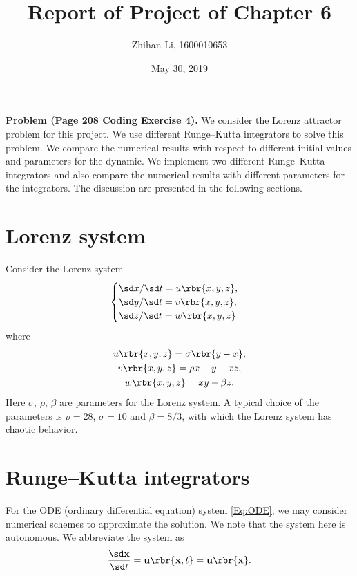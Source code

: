 \documentclass[english, nochinese]{pnote}
\title{Report of Project of Chapter 6}
\author{Zhihan Li, 1600010653}
\date{May 30, 2019}
\begin{document}
\maketitle

\textbf{Problem (Page 208 Coding Exercise 4).} We consider the Lorenz attractor problem for this project. We use different Runge--Kutta integrators to solve this problem. We compare the numerical results with respect to different initial values and parameters for the dynamic. We implement two different Runge--Kutta integrators and also compare the numerical results with different parameters for the integrators. The discussion are presented in the following sections.

\section{Lorenz system}

Consider the Lorenz system
\begin{equation} \label{Eq:ODE}
\begin{cases}
\sd x / \sd t = u \rbr{ x, y, z }, \\
\sd y / \sd t = v \rbr{ x, y, z }, \\
\sd z / \sd t = w \rbr{ x, y, z }
\end{cases}
\end{equation}
where
\begin{gather}
u \rbr{ x, y, z } = \sigma \rbr{ y - x }, \\
v \rbr{ x, y, z } = \rho x - y - x z, \\
w \rbr{ x, y, z } = x y - \beta z.
\end{gather}
Here $\sigma$, $\rho$, $\beta$ are parameters for the Lorenz system. A typical choice of the parameters is $ \rho = 28 $, $ \sigma = 10 $ and $ \beta = 8 / 3 $, with which the Lorenz system has chaotic behavior.

\section{Runge--Kutta integrators}

For the ODE (ordinary differential equation) system \eqref{Eq:ODE}, we may consider numerical schemes to approximate the solution. We note that the system here is autonomous. We abbreviate the system as 
\begin{equation} \label{Eq:ODESys}
\frac{ \sd \mathbf{x} }{ \sd t } = \mathbf{u} \rbr{ \mathbf{x}, t } = \mathbf{u} \rbr{\mathbf{x}}.
\end{equation}
\end{document}
